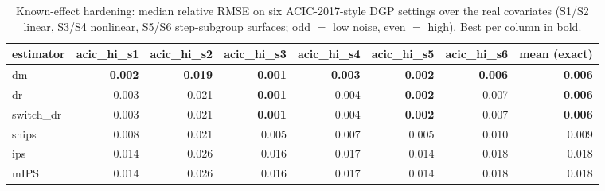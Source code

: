 \begin{table}[t]\centering
\caption{Known-effect hardening: median relative RMSE on six ACIC-2017-style DGP settings over the real  covariates (S1/S2 linear, S3/S4 nonlinear, S5/S6 step-subgroup surfaces; odd $=$ low noise, even $=$ high). Best per column in bold.}
\label{tab:acic-hardening}
\begin{tabular}{lrrrrrrr}
\toprule
estimator & acic_hi_s1 & acic_hi_s2 & acic_hi_s3 & acic_hi_s4 & acic_hi_s5 & acic_hi_s6 & mean (exact) \\
\midrule
dm & \textbf{0.002} & \textbf{0.019} & \textbf{0.001} & \textbf{0.003} & \textbf{0.002} & \textbf{0.006} & \textbf{0.006} \\
dr & 0.003 & 0.021 & \textbf{0.001} & 0.004 & \textbf{0.002} & 0.007 & \textbf{0.006} \\
switch\_dr & 0.003 & 0.021 & \textbf{0.001} & 0.004 & \textbf{0.002} & 0.007 & \textbf{0.006} \\
snips & 0.008 & 0.021 & 0.005 & 0.007 & 0.005 & 0.010 & 0.009 \\
ips & 0.014 & 0.026 & 0.016 & 0.017 & 0.014 & 0.018 & 0.018 \\
mIPS & 0.014 & 0.026 & 0.016 & 0.017 & 0.014 & 0.018 & 0.018 \\
\bottomrule
\end{tabular}
\end{table}